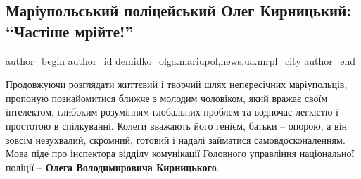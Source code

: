  
 
 
 
 
 
\subsection{Маріупольський поліцейський Олег Кирницький: \enquote{Частіше мрійте!}}
\label{sec:22_08_2019.stz.news.ua.mrpl_city.1.mrpl_policeman_oleg_kyrnyckyj_chastishe_mrijte}
 
\ifcmt
 author_begin
   author_id demidko_olga.mariupol,news.ua.mrpl_city
 author_end
\fi


Продовжуючи розглядати життєвий і творчий шлях непересічних маріупольців,
пропоную познайомитися ближче з молодим чоловіком, який вражає своїм
інтелектом, глибоким розумінням глобальних проблем та водночас легкістю і
простотою в спілкуванні. Колеги вважають його генієм, батьки – опорою, а він
зовсім незухвалий, скромний, готовий і надалі займатися самовдосконаленням.
Мова піде про інспектора відділу комунікації Головного управління національної
поліції – \textbf{Олега Володимировича Кирницького}.


